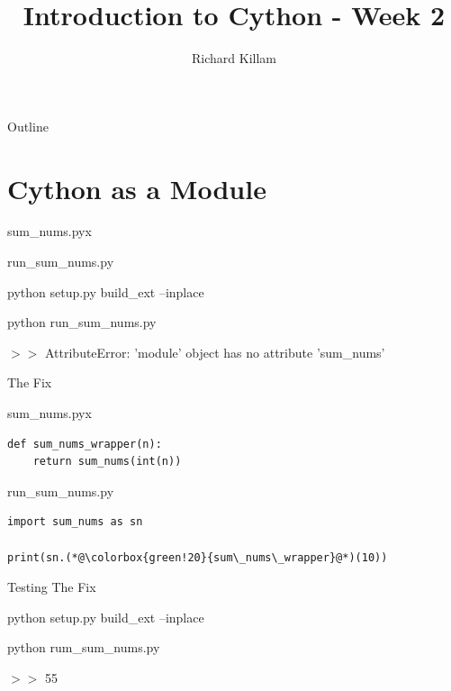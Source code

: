 \documentclass[11pt]{beamer}
\author{Richard Killam}
\title{Introduction to Cython - Week 2}
\begin{document}
\centering

\begin{frame}
	\titlepage
\end{frame}

\begin{frame}{Outline}
	\begin{multicols}{2}
		\tableofcontents
	\end{multicols}
\end{frame}

\section{Cython as a Module}
\begin{frame}[fragile]{sum\_nums.pyx}
	\pause
	
\end{frame}

\begin{frame}[fragile]{run\_sum\_nums.py}
	\raggedright
	\pause
	
	
	\pause
	python setup.py build\_ext --inplace
	
	python run\_sum\_nums.py
	
	\pause
	$>>$ AttributeError: 'module' object has no attribute 'sum\_nums'
	
\end{frame}

\begin{frame}[fragile]{The Fix}
	\raggedright
	
	sum\_nums.pyx	
	\begin{lstlisting}
def sum_nums_wrapper(n):
    return sum_nums(int(n))
	\end{lstlisting}
	
	\vspace{1cm}	
	
	\pause
	run\_sum\_nums.py
	\begin{lstlisting}
import sum_nums as sn
		
print(sn.(*@\colorbox{green!20}{sum\_nums\_wrapper}@*)(10))
	\end{lstlisting}
\end{frame}

\begin{frame}[fragile]{Testing The Fix}
	\raggedright
	python setup.py build\_ext --inplace
	
	python rum\_sum\_nums.py
	
	\pause
	$>>$ 55
	
\end{frame}
\end{document}

